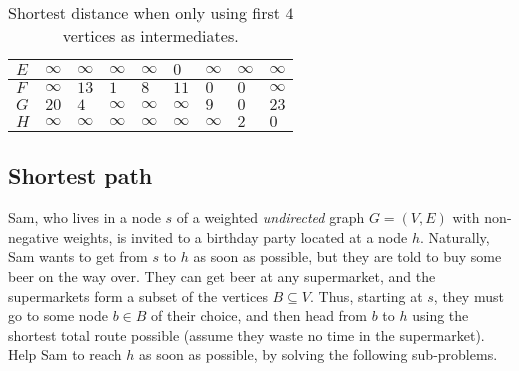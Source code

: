 \begin{solution}
\begin{table}[H]
\begin{tabular}{|l|l|l|l|l|l|l|l|l|}
$E$    & $\infty$ & $\infty$ & $\infty$ & $\infty$ & $0$ & $\infty$ & $\infty$ & $\infty$ \\ \hline
$F$    & $\infty$ & $13$ & $1$ & $8$ & $11$ & $0$ & $0$ & $\infty$ \\ \hline
$G$    & $20$ & $4$ & $\infty$ & $\infty$ & $\infty$ & $9$ & $0$ & $23$ \\ \hline
$H$    & $\infty$ & $\infty$ & $\infty$ & $\infty$ & $\infty$ & $\infty$ & $2$ & $0$ \\ \hline
\end{tabular}
\caption{Shortest distance when only using first $4$ vertices as intermediates.}
\end{table}
\end{solution}
\newpage
\subsection{Shortest path}
\label{question:birthdayparty}
Sam, who lives in a node $s$ of a weighted \emph{undirected} graph $G = (V, E)$ with non-negative weights, is invited to a birthday party located at a node $h$. Naturally, Sam wants to get from $s$ to $h$ as soon as possible, but they are told to buy some beer on the way over. They can get beer at any supermarket, and the supermarkets form a subset of the vertices $B \subseteq V$. Thus, starting at $s$, they must go to some node $b \in B$ of their choice, and then head from $b$ to $h$ using the shortest total route possible (assume they waste no time in the supermarket). Help Sam to reach $h$ as soon as possible, by solving the following sub-problems. 

